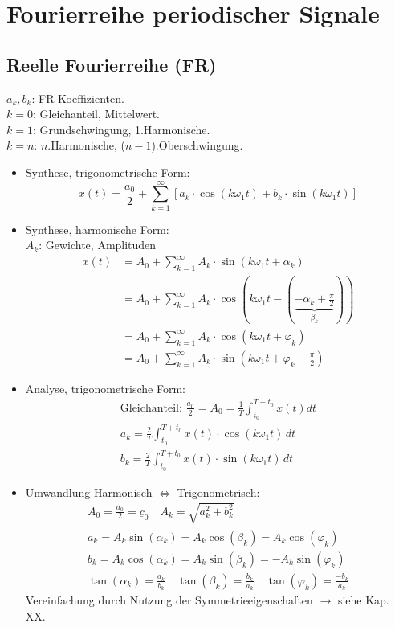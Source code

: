 \newpage
\section{Fourierreihe periodischer Signale}
\subsection{Reelle Fourierreihe (FR)}
		
{\small $a_k, b_k$: FR-Koeffizienten.\\
	$k=0$: Gleichanteil, Mittelwert.\\
	$k=1$: Grundschwingung, 1.Harmonische.\\
	$k=n$: $n$.Harmonische, ($n-1$).Oberschwingung.}
	\begin{itemize}
		\item Synthese, trigonometrische Form:
		      \[
			      x(t) = \frac{a_0}{2} + \sum_{k=1}^\infty [a_k\cdot \cos(k\omega_1 t)+ b_k\cdot \sin(k\omega_1 t)]
		      \]
		\item Synthese, harmonische Form:\\
				{\small $A_k$: Gewichte, Amplituden}
		      \begin{align*}
			      x(t) & = A_0+\sum_{k=1}^\infty A_k\cdot \sin (k\omega_1 t + \alpha_k)              \\
			           & = A_0+\sum_{k=1}^\infty A_k\cdot \cos (k\omega_1 t -( \underbrace{-\alpha_k+\frac{\pi}{2} }_{\beta_k}))\\
			           & = \boxed{A_0+\sum_{k=1}^\infty A_k\cdot \cos (k\omega_1 t + \varphi_k)}\\
  			           & = A_0+\sum_{k=1}^\infty A_k \cdot \sin (k\omega_1 t + \varphi_k - \frac{\pi}{2})
		      \end{align*}

		\item Analyse, trigonometrische Form:
		\begin{gather*}
		      	\text{Gleichanteil: }\frac{a_0}{2}= A_0 = \frac{1}{T}\int_{t_0}^{T+t_0} x(t)dt\\
			      a_k = \frac{2}{T}\int_{t_0}^{T+t_0} x(t)\cdot \cos(k\omega_1 t)\,dt \\
			      b_k = \frac{2}{T}\int_{t_0}^{T+t_0} x(t)\cdot \sin(k\omega_1 t)\,dt
		\end{gather*}
		\item Umwandlung Harmonisch $\Leftrightarrow$ Trigonometrisch:
		\begin{gather*}
			A_0 = \frac{a_0}{2} = \underline{c}_0 \quad
			A_k = \sqrt{a_k^2+b_k^2}\\
			a_k = A_k \sin(\alpha_k) = A_k \cos(\beta_k) = A_k \cos(\varphi_k)\\
			b_k = A_k \cos(\alpha_k) = A_k \sin(\beta_k) = - A_k \sin(\varphi_k)\\
			\tan(\alpha_k)=\frac{a_k}{b_k} \quad \tan(\beta_k)=\frac{b_k}{a_k} \quad \tan(\varphi_k)=\frac{-b_k}{a_k}
		\end{gather*}
		Vereinfachung durch Nutzung der Symmetrieeigenschaften $\rightarrow$ siehe Kap. XX.
	\end{itemize}


